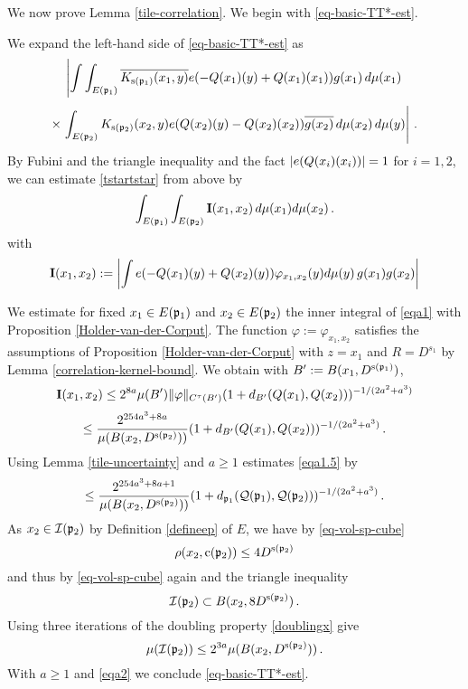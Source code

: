 {We now prove Lemma \ref{tile-correlation}. We begin with  \eqref{eq-basic-TT*-est}.

We expand the left-hand side of \eqref{eq-basic-TT*-est} as
\begin{equation}\label{tstartstar}
\left|\int \int_{E({\mathfrak p}_1)} \overline{K_{{\mathrm{s}}({\mathfrak p}_1)}(x_1,y)}e(-{Q}(x_1)(y)+
    {Q}(x_1)(x_1))g(x_1)\, d\mu(x_1) \right.
\end{equation}
\begin{equation}
 \times \left.\int_{E({\mathfrak p}_2)} {K_{{\mathrm{s}}({\mathfrak p}_2)}(x_2,y)}e({Q}(x_2)(y)
    -{Q}(x_2)(x_2))\overline{g(x_2)}\, d\mu(x_2)\, d\mu(y)\right|\, .
\end{equation}
By Fubini and the triangle inequality and
the fact $|e({Q}(x_i)(x_i))|=1$ for $i=1,2$, we can estimate
\eqref{tstartstar} from above by
\begin{equation}\label{eqa1}
    \int_{E({\mathfrak p}_1)} \int_{E({\mathfrak p}_2)} {\bf I}(x_1, x_2)\, d\mu(x_1)d\mu(x_2)\,.
\end{equation}
with
\begin{equation}
    {\bf I}(x_1, x_2):=
    \left|\int
    e(-{Q}(x_1)(y)+{Q}(x_2)(y))\varphi_{x_1,x_2}(y)
    d\mu(y) \, g(x_1)g(x_2)\right|
\end{equation}


We estimate for fixed $x_1\in E({\mathfrak p}_1)$ and
$x_2\in E({\mathfrak p}_2)$ the inner integral of \eqref{eqa1} with
Proposition \ref{Holder-van-der-Corput}. The function
$\varphi:=\varphi_{x_1,x_2}$ satisfies the assumptions of
Proposition \ref{Holder-van-der-Corput} with $z = x_1$ and $R = D^{s_1}$ by Lemma \ref{correlation-kernel-bound}.
We obtain with $B':= B(x_1, D^{{\mathrm{s}}({\mathfrak p}_1)})$,
\begin{equation*}
 {\bf I}(x_1, x_2) \le     2^{8a} \mu(B') \|{\varphi}\|_{C^\tau(B')}
       (1 + d_{B'}({Q}(x_1),{Q}(x_2)))^{-1/(2a^2+a^3)}
\end{equation*}
\begin{equation}
\label{eqa1.5}
 \le     \frac{2^{254a^3+8a}}
 {\mu(B(x_2, D^{{\mathrm{s}}({\mathfrak p}_2)}))}
       (1 + d_{B'}({Q}(x_1),{Q}(x_2)))^{-1/(2a^2+a^3)}\,.
\end{equation}
Using Lemma \ref{tile-uncertainty} and $a\ge 1$ estimates \eqref{eqa1.5} by
\begin{equation}\label{eqa2}
 \le     \frac{2^{254a^3 + 8a + 1}}
 {\mu(B(x_2, D^{{\mathrm{s}}({\mathfrak p}_2)}))}
       (1+d_{{\mathfrak p}_1}({\mathcal{Q}}({\mathfrak p}_1), {\mathcal{Q}}({\mathfrak p}_2)))^{-1/(2a^2+a^3)}\,.
\end{equation}
As $x_2\in {\mathcal{I}}({\mathfrak p}_2)$ by Definition \eqref{defineep} of $E$, we have by \eqref{eq-vol-sp-cube}
\begin{equation}
    \rho(x_2,{\mathrm{c}}({\mathfrak p}_2))\le 4D^{{\mathrm{s}}({\mathfrak p}_2)}
\end{equation}
and thus by \eqref{eq-vol-sp-cube} again and the triangle inequality
\begin{equation}
    {\mathcal{I}}({\mathfrak p}_2)\subset B(x_2,8D^{{\mathrm{s}}({\mathfrak p}_2)})\, .
\end{equation}
Using three iterations of the doubling property \eqref{doublingx} give
\begin{equation}
    \mu({\mathcal{I}}({\mathfrak p}_2))\le 2^{3a}\mu(B(x_2,D^{{\mathrm{s}}({\mathfrak p}_2)}))\, .
\end{equation}
With $a\ge 1$ and \eqref{eqa2} we conclude \eqref{eq-basic-TT*-est}.


}
